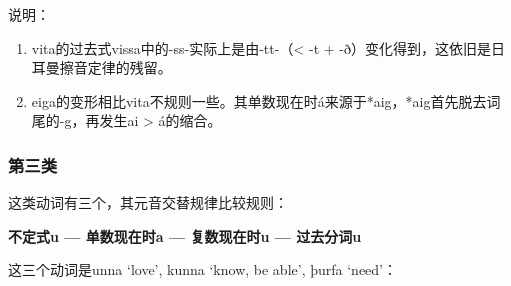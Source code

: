 说明：

\begin{enumerate}
    \item
          vita的过去式vissa中的-ss-实际上是由-tt-（< -t +
          -ð）变化得到，这依旧是日耳曼擦音定律的残留。
    \item
          eiga的变形相比vita不规则一些。其单数现在时á来源于*aig，*aig首先脱去词尾的-g，再发生ai
          > á的缩合。
\end{enumerate}


\subsubsection{第三类}

这类动词有三个，其元音交替规律比较规则：
\begin{center}
    \textbf{不定式u --- 单数现在时a --- 复数现在时u --- 过去分词u}
\end{center}


这三个动词是unna `love‌', kunna `know, be able‌', þurfa `need‌'：


